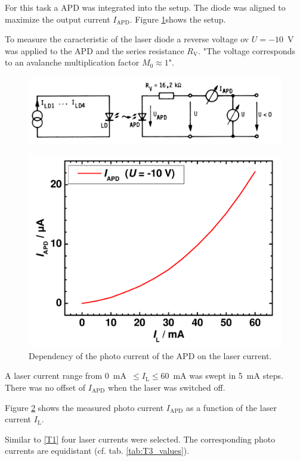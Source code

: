 For this task a APD was integrated into the setup. The diode was aligned to maximize the output current $I_{\mathrm{APD}}$.
Figure \ref{fig:T3_setup}\footnotemark[1] shows the setup.

To measure the caracteristic of the laser diode a reverse voltage ov $U = -10$~V was applied to the APD and the series resistance $R_{\mathrm{V}}$. "The voltage corresponds to an avalanche multiplication factor $M_0 \approx 1$"\footnotemark[1].

\begin{figure}%
\centering
\includegraphics[width=.85\columnwidth]{Grafiken/T3_setup.jpg}%
\caption{}%
\label{fig:T3_setup}%
\end{figure}


\begin{figure}%
\centering
\includegraphics[width=.5\columnwidth]{Grafiken/T3_laser.pdf}%
\caption{Dependency of the photo current of the APD on the laser current.}%
\label{fig:T3_laser}%
\end{figure}


A laser current range from 0~mA~$\leq I_{\mathrm{L}} \leq 60$~mA was swept in 5~mA steps. There was no offset of $I_{\mathrm{APD}}$ when the laser was switched off. 

Figure \ref{fig:T3_laser} shows the measured photo current $I_{\mathrm{APD}}$ as a function of the laser current $I_{\mathrm{L}}$. 


Similar to \ref{T1} four laser currents were selected. The corresponding photo currents are equidistant (cf. tab. \ref{tab:T3_values}).

